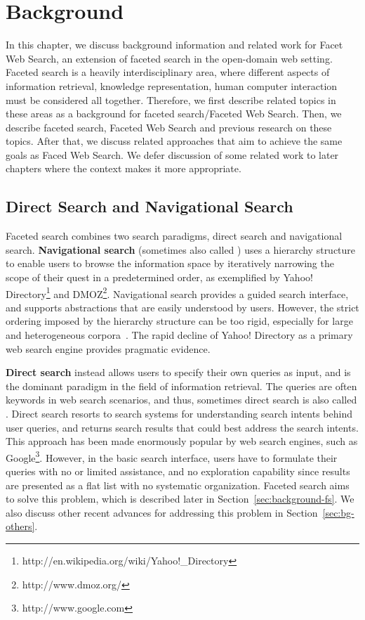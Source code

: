 \chapter{Background}
\label{ch:bg}
In this chapter, we discuss background information and related work for Facet Web Search, an extension of faceted search in the open-domain web setting. Faceted search is a heavily interdisciplinary area, where different aspects of information retrieval, knowledge representation, human computer interaction must be considered all together. Therefore, we first describe related topics in these areas as a background for faceted search/Faceted Web Search. Then, we describe faceted search, Faceted Web Search and previous research on these topics. After that, we discuss related approaches that aim to achieve the same goals as Faced Web Search. We defer discussion of some related work to later chapters where the context makes it more appropriate.

\section{Direct Search and Navigational Search}
Faceted search combines two search paradigms, direct search and navigational search. \textbf{Navigational search} (sometimes also called ) uses a hierarchy structure to enable users to browse the information space by iteratively narrowing the scope of their quest in a predetermined order, as exemplified by Yahoo! Directory\footnote{http://en.wikipedia.org/wiki/Yahoo!\_Directory} and DMOZ\footnote{http://www.dmoz.org/}. Navigational search provides a guided search interface, and supports abstractions that are easily understood by users. However, the strict ordering imposed by the hierarchy structure can be too rigid, especially for large and heterogeneous corpora~\cite{snow2006semantic,tunkelang2009faceted,sacco2009dynamic}. The rapid decline of Yahoo! Directory as a primary web search engine provides pragmatic evidence.

\textbf{Direct search} instead allows users to specify their own queries as input, and is the dominant paradigm in the field of information retrieval. The queries are often keywords in web search scenarios, and thus, sometimes direct search is also called . Direct search resorts to search systems for understanding search intents behind user queries, and returns search results that could best address the search intents. This approach has been made enormously popular by web search engines, such as Google\footnote{http://www.google.com}. However, in the basic search interface, users have to formulate their queries with no or limited assistance, and no exploration capability since results are presented as a flat list with no systematic organization. Faceted search aims to solve this problem, which is described later in Section~\ref{sec:background-fs}. We also discuss other recent advances for addressing this problem in Section~\ref{sec:bg-others}.

